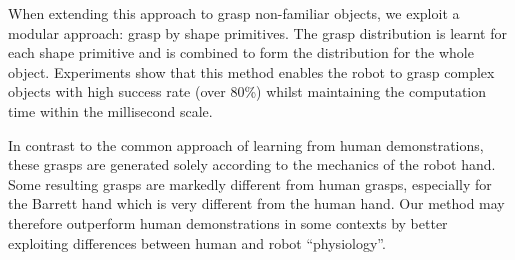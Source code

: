 When extending this approach to grasp non-familiar objects, we exploit a modular approach: grasp by shape primitives. The grasp distribution is learnt for each shape primitive and is combined to form the distribution for the whole object. Experiments show that this method enables the robot to grasp complex objects with high success rate (over 80\%) whilst maintaining the computation time within the millisecond scale.

In contrast to the common approach of learning from human demonstrations,
these grasps are generated solely according to the mechanics of the robot hand.
Some resulting grasps are markedly different from  human grasps, especially for the Barrett hand which is very different from the human hand.
Our method may therefore outperform human demonstrations in some
contexts by better exploiting differences between human and robot ``physiology''. 